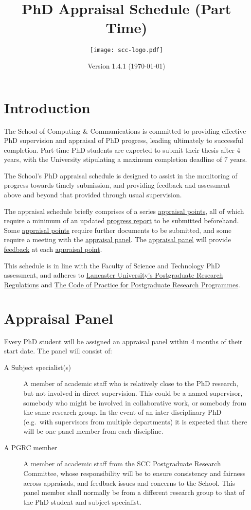 \documentclass[12pt,a4paper]{article}
\title{PhD Appraisal Schedule (Part Time)}
\author{\texttt{[image: scc-logo.pdf]}}
\date{Version 1.4.1 (\today)}
\begin{document}
\maketitle

\section{Introduction}
The School of Computing \& Communications is committed to providing effective PhD supervision and appraisal of PhD progress, leading ultimately to successful completion. Part-time PhD students are expected to submit their thesis after 4 years, with the University stipulating a maximum completion deadline of 7 years.

The School's PhD appraisal schedule is designed to assist in the monitoring of progress towards timely submission, and providing feedback and assessment above and beyond that provided through usual supervision.

The appraisal schedule briefly comprises of a series \hyperref[sec:points]{appraisal points}, all of which require a minimum of an updated \hyperref[sec:report]{progress report} to be submitted beforehand. Some \hyperref[sec:points]{appraisal points} require further documents to be submitted, and some require a meeting with the \hyperref[sec:panel]{appraisal panel}. The \hyperref[sec:panel]{appraisal panel} will provide \hyperref[sec:feedback]{feedback} at each \hyperref[sec:points]{appraisal point}.

This schedule is in line with the Faculty of Science and Technology PhD assessment, and adheres to
\href{https://gap.lancs.ac.uk/ASQ/QAE/MARP/Documents/PGR-Regs.pdf}{Lancaster University's Postgraduate Research Regulations} and 
\href{https://gap.lancs.ac.uk/ASQ/Policies/Documents/Postgraduate-Research-Code-of-Practice.pdf}{The Code of Practice for Postgraduate Research Programmes}.

\section{Appraisal Panel} \label{sec:panel}
Every PhD student will be assigned an appraisal panel within 4 months of their start date. The panel will consist of:
\begin{description}
	\item[A Subject specialist(s)] A member of academic staff who is relatively close to the PhD research, but not involved in direct supervision. This could be a named supervisor, somebody who might be involved in collaborative work, or somebody from the same research group. In the event of an inter-disciplinary PhD (e.g.\ with supervisors from multiple departments) it is expected that there will be one panel member from each discipline.
	\item[A PGRC member] A member of academic staff from the SCC Postgraduate Research Committee, whose responsibility will be to ensure consistency and fairness across appraisals, and feedback issues and concerns to the School. This panel member shall normally be from a different research group to that of the PhD student and subject specialist.
\end{description}
\end{document}
